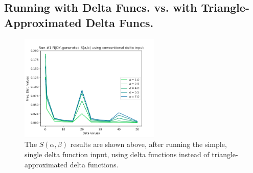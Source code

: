 \documentclass[a4paper]{article}
\begin{document}
\subsection{Running with Delta Funcs. vs. with Triangle-Approximated Delta Funcs.}
\begin{figure}[H]
\centering
\includegraphics[width=0.6\textwidth]{run1_sab_using_just_delta_funcs.png}
\caption{\label{fig:run2_just_delta} The $S(\alpha,\beta)$ results are shown above, after running the simple, single delta function input, using delta functions instead of triangle-approximated delta functions.}
\end{figure}
\end{document}
